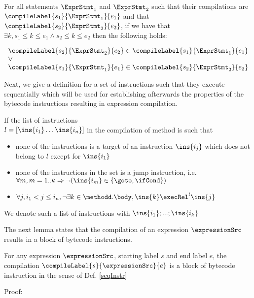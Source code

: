 \begin{compProp6}\label{compile:prop:compProp6}
For all statements $\ExprStmt_1$ and $\ExprStmt_2$ such that their compilations are 
 $\compileLabel{s_1}{\ExprStmt_1}{e_1} $ and that   $\compileLabel{s_2}{\ExprStmt_2}{e_2} $, if we have that 
$ \exists k,  s_1 \le k  \le e_1 \wedge s_2 \le k  \le e_2  $ then the following holds:

$$\begin{array}{l}
         \compileLabel{s_2}{\ExprStmt_2}{e_2}  \in \compileLabel{s_1}{\ExprStmt_1}{e_1}\\   
	 \vee \\
	 \compileLabel{s_1}{\ExprStmt_1}{e_1}  \in \compileLabel{s_2}{\ExprStmt_2}{e_2} 
\end{array}$$
\end{compProp6}

Next, we give a definition for a set of instructions such that they execute sequentially which will be used for 
establishing afterwards the properties of the bytecode instructions resulting in expression compilation. 
\begin{seqInstr} \label{seqInstr}
If the list of  instructions \\ $l  = \lbrack \ins{i_1} \ldots \ins{i_n} \rbrack$ in the compilation of method \methodd is such that 
 \begin{itemize}
              
      \item none of the instructions is a target of an instruction $\ins{i_j}$ which does not belong to $l$ except for $\ins{i_1}$
      \item none of the instructions in the set is a jump instruction, i.e. $\forall m, m = 1..k \Rightarrow \neg( \ins{i_m} \in  \{\goto, \ifCond\} )  $ 
      \item $  \forall j, i_1 <  j \le i_n , \neg \exists k \in \methodd.\body, \ins{k} \execRel^{l} \ins{j} $ 
 \end{itemize}

We denote such a list of instructions with $\ins{i_1};...;\ins{i_k}$

\end{seqInstr}


The next lemma states that the compilation of an expression $\expressionSrc$ results in
 a block of bytecode instructions.  
\begin{compProp3}\label{compile:prop:compProp3}
    For any expression $\expressionSrc$, starting label $s$ and end label $e$,
    the compilation $\compileLabel{s}{\expressionSrc}{e}$ is a block of bytecode instruction in the sense of Def. \ref{seqInstr}
   
\end{compProp3}
Proof:

